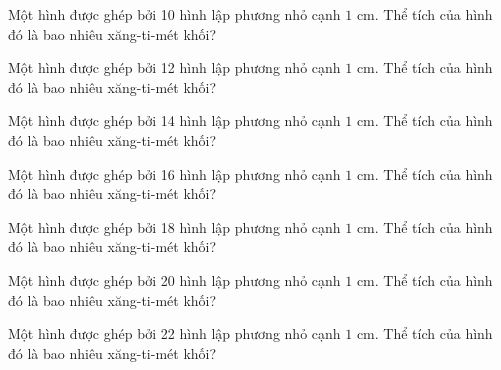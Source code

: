 
\begin{ex}
  Một hình được ghép bởi 10 hình lập phương nhỏ cạnh $1\text{ cm}$. Thể tích của hình đó là bao nhiêu xăng-ti-mét khối?
\end{ex}

\begin{ex}
  Một hình được ghép bởi 12 hình lập phương nhỏ cạnh $1\text{ cm}$. Thể tích của hình đó là bao nhiêu xăng-ti-mét khối?
\end{ex}

\begin{ex}
  Một hình được ghép bởi 14 hình lập phương nhỏ cạnh $1\text{ cm}$. Thể tích của hình đó là bao nhiêu xăng-ti-mét khối?
\end{ex}

\begin{ex}
  Một hình được ghép bởi 16 hình lập phương nhỏ cạnh $1\text{ cm}$. Thể tích của hình đó là bao nhiêu xăng-ti-mét khối?
\end{ex}

\begin{ex}
  Một hình được ghép bởi 18 hình lập phương nhỏ cạnh $1\text{ cm}$. Thể tích của hình đó là bao nhiêu xăng-ti-mét khối?
\end{ex}

\begin{ex}
  Một hình được ghép bởi 20 hình lập phương nhỏ cạnh $1\text{ cm}$. Thể tích của hình đó là bao nhiêu xăng-ti-mét khối?
\end{ex}

\begin{ex}
  Một hình được ghép bởi 22 hình lập phương nhỏ cạnh $1\text{ cm}$. Thể tích của hình đó là bao nhiêu xăng-ti-mét khối?
\end{ex}


